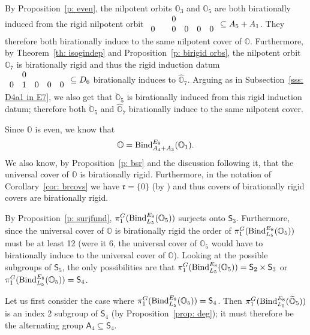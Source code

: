 \documentclass[11pt]{amsart}
\renewcommand{\O}{{\mathbb O}}
\renewcommand{\r}{{\mathfrak r}}
\newcommand{\Alt}{{\mathsf{A}}}
\newcommand{\Sym}{{\mathsf{S}}}
\newcommand{\BInd}{{{\mbox{\rm Bind}}}}
\newcommand{\covO}{\widetilde{\O}}
\newcommand{\hatO}{\widehat{\O}}
\newcommand{\breveO}{\breve{\O}}
\numberwithin{equation}{section}
\begin{document}
	
	By Proposition~\ref{p: even}, the nilpotent orbits $\O_3$ and $\O_5$ are both birationally induced from the rigid nilpotent orbit $\begin{array}{c c c c c c}
		& & 0 & & &  \\
		0 & & 0 & 0 & 0 & 0 \\
	\end{array}\subseteq A_5 + A_1$. They therefore both       birationally induce to the same nilpotent cover of         $\O$. Furthermore, by Theorem~\ref{th: isogindep} and Proposition~\ref{p: birigid orbs}, the nilpotent orbit $\O_7$ is birationally rigid and thus the rigid induction datum $\begin{array}{c c c c c}
		& 0 & & &  \\
		0 & 1 & 0 & 0 & 0 \\
	\end{array}\subseteq D_6$ birationally induces to $\hatO_7$. Arguing as in Subsection~\ref{sss: D4a1 in E7}, we also get that $\breveO_5$ is birationally induced from this rigid induction datum; therefore both $\breveO_5$ and $\hatO_7$ birationally induce to the same nilpotent cover.
	
	
	Since $\O$ is even, we know that $$\O=\BInd_{A_4 + A_3}^{E_8}(\O_1).$$ We also know, by Proposition~\ref{p: bsr} and the discussion following it, that the universal cover of $\O$ is birationally rigid. Furthermore, in the notation of Corollary~\ref{cor: brcovs} we have $\r=\{0\}$ (by \cite[\S13.1]{Car}) and thus covers of birationally rigid covers are birationally rigid.
	
	By Proposition~\ref{p: surjfund}, $\pi_1^G(\BInd_{L_5}^{E_8}(\O_5))$ surjects onto $\Sym_3$. Furthermore, since the universal cover of $\O$ is birationally rigid the order of $\pi_1^G(\BInd_{L_5}^{E_8}(\O_5))$ must be at least 12 (were it 6, the universal cover of $\O_5$ would have to birationally induce to the universal cover of $\O$). Looking at the possible subgroups of $\Sym_5$, the only possibilities are that $\pi_1^G(\BInd_{L_5}^{E_8}(\O_5))=\Sym_2\times \Sym_3$ or $\pi_1^G(\BInd_{L_5}^{E_8}(\O_5))=\Sym_4$.
	
	Let us first consider the case where $\pi_1^G(\BInd_{L_5}^{E_8}(\O_5))=\Sym_4$. Then $\pi_1^G(\BInd_{L_5}^{E_8}(\covO_5))$ is an index 2 subgroup of $\Sym_4$ (by Proposition~\ref{prop: deg}); it must therefore be the alternating group $\Alt_4\subseteq \Sym_4$.
	
\end{document}
